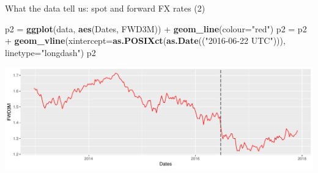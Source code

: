 \documentclass[ignorenonframetext,aspectratio=169]{beamer}
\newenvironment{Shaded}{}{}
\newcommand{\KeywordTok}[1]{\textcolor[rgb]{0.00,0.44,0.13}{\textbf{#1}}}
\newcommand{\DataTypeTok}[1]{\textcolor[rgb]{0.56,0.13,0.00}{#1}}
\newcommand{\StringTok}[1]{\textcolor[rgb]{0.25,0.44,0.63}{#1}}
\newcommand{\OperatorTok}[1]{\textcolor[rgb]{0.40,0.40,0.40}{#1}}
\newcommand{\NormalTok}[1]{#1}
\begin{document}
\begin{frame}[fragile]{What the data tell us: spot and forward FX rates
(2)}

\begin{Shaded}
\begin{Highlighting}[]
\NormalTok{p2 =}\StringTok{ }\KeywordTok{ggplot}\NormalTok{(data, }\KeywordTok{aes}\NormalTok{(Dates, FWD3M)) }\OperatorTok{+}\StringTok{ }\KeywordTok{geom_line}\NormalTok{(}\DataTypeTok{colour=}\StringTok{"red"}\NormalTok{) }
\NormalTok{p2 =}\StringTok{ }\NormalTok{p2 }\OperatorTok{+}\StringTok{ }\KeywordTok{geom_vline}\NormalTok{(}\DataTypeTok{xintercept=}\KeywordTok{as.POSIXct}\NormalTok{(}\KeywordTok{as.Date}\NormalTok{((}\StringTok{"2016-06-22 UTC"}\NormalTok{))),}
                     \DataTypeTok{linetype=}\StringTok{"longdash"}\NormalTok{)}
\NormalTok{p2}
\end{Highlighting}
\end{Shaded}

\includegraphics[width=1\linewidth]{2018_02_07_IMF_FXCourse_files/figure-beamer/unnamed-chunk-9-1}

\end{frame}
\end{document}
